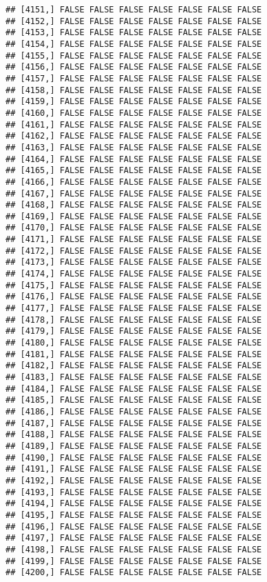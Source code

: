 \documentclass[
]{article}
\begin{document}
\begin{verbatim}
## [4151,] FALSE FALSE FALSE FALSE FALSE FALSE FALSE
## [4152,] FALSE FALSE FALSE FALSE FALSE FALSE FALSE
## [4153,] FALSE FALSE FALSE FALSE FALSE FALSE FALSE
## [4154,] FALSE FALSE FALSE FALSE FALSE FALSE FALSE
## [4155,] FALSE FALSE FALSE FALSE FALSE FALSE FALSE
## [4156,] FALSE FALSE FALSE FALSE FALSE FALSE FALSE
## [4157,] FALSE FALSE FALSE FALSE FALSE FALSE FALSE
## [4158,] FALSE FALSE FALSE FALSE FALSE FALSE FALSE
## [4159,] FALSE FALSE FALSE FALSE FALSE FALSE FALSE
## [4160,] FALSE FALSE FALSE FALSE FALSE FALSE FALSE
## [4161,] FALSE FALSE FALSE FALSE FALSE FALSE FALSE
## [4162,] FALSE FALSE FALSE FALSE FALSE FALSE FALSE
## [4163,] FALSE FALSE FALSE FALSE FALSE FALSE FALSE
## [4164,] FALSE FALSE FALSE FALSE FALSE FALSE FALSE
## [4165,] FALSE FALSE FALSE FALSE FALSE FALSE FALSE
## [4166,] FALSE FALSE FALSE FALSE FALSE FALSE FALSE
## [4167,] FALSE FALSE FALSE FALSE FALSE FALSE FALSE
## [4168,] FALSE FALSE FALSE FALSE FALSE FALSE FALSE
## [4169,] FALSE FALSE FALSE FALSE FALSE FALSE FALSE
## [4170,] FALSE FALSE FALSE FALSE FALSE FALSE FALSE
## [4171,] FALSE FALSE FALSE FALSE FALSE FALSE FALSE
## [4172,] FALSE FALSE FALSE FALSE FALSE FALSE FALSE
## [4173,] FALSE FALSE FALSE FALSE FALSE FALSE FALSE
## [4174,] FALSE FALSE FALSE FALSE FALSE FALSE FALSE
## [4175,] FALSE FALSE FALSE FALSE FALSE FALSE FALSE
## [4176,] FALSE FALSE FALSE FALSE FALSE FALSE FALSE
## [4177,] FALSE FALSE FALSE FALSE FALSE FALSE FALSE
## [4178,] FALSE FALSE FALSE FALSE FALSE FALSE FALSE
## [4179,] FALSE FALSE FALSE FALSE FALSE FALSE FALSE
## [4180,] FALSE FALSE FALSE FALSE FALSE FALSE FALSE
## [4181,] FALSE FALSE FALSE FALSE FALSE FALSE FALSE
## [4182,] FALSE FALSE FALSE FALSE FALSE FALSE FALSE
## [4183,] FALSE FALSE FALSE FALSE FALSE FALSE FALSE
## [4184,] FALSE FALSE FALSE FALSE FALSE FALSE FALSE
## [4185,] FALSE FALSE FALSE FALSE FALSE FALSE FALSE
## [4186,] FALSE FALSE FALSE FALSE FALSE FALSE FALSE
## [4187,] FALSE FALSE FALSE FALSE FALSE FALSE FALSE
## [4188,] FALSE FALSE FALSE FALSE FALSE FALSE FALSE
## [4189,] FALSE FALSE FALSE FALSE FALSE FALSE FALSE
## [4190,] FALSE FALSE FALSE FALSE FALSE FALSE FALSE
## [4191,] FALSE FALSE FALSE FALSE FALSE FALSE FALSE
## [4192,] FALSE FALSE FALSE FALSE FALSE FALSE FALSE
## [4193,] FALSE FALSE FALSE FALSE FALSE FALSE FALSE
## [4194,] FALSE FALSE FALSE FALSE FALSE FALSE FALSE
## [4195,] FALSE FALSE FALSE FALSE FALSE FALSE FALSE
## [4196,] FALSE FALSE FALSE FALSE FALSE FALSE FALSE
## [4197,] FALSE FALSE FALSE FALSE FALSE FALSE FALSE
## [4198,] FALSE FALSE FALSE FALSE FALSE FALSE FALSE
## [4199,] FALSE FALSE FALSE FALSE FALSE FALSE FALSE
## [4200,] FALSE FALSE FALSE FALSE FALSE FALSE FALSE

\end{verbatim}
\end{document}
